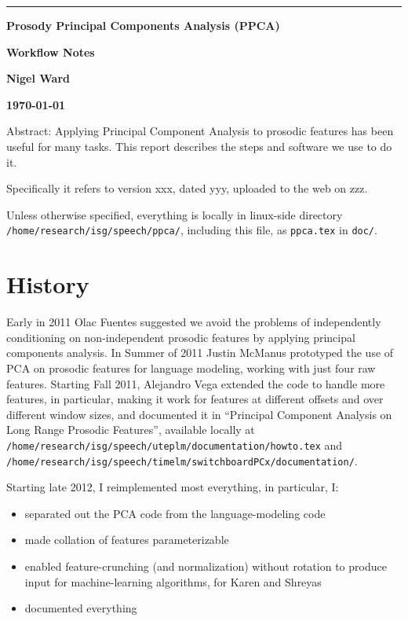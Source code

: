 \documentclass[11pt]{article}
\begin{document}
\noindent
\thispagestyle{empty}
\sloppy

\rule{1mm}{0mm}

\vspace{-17mm}
{\LARGE \bf Prosody Principal Components Analysis (PPCA) }
\medskip


{\LARGE \bf Workflow Notes}
\vspace{7mm}


{\bf Nigel Ward}

{\bf \today }

Abstract: Applying Principal Component Analysis to prosodic features
has been useful for many tasks.  This report describes the steps and
software we use to do it.  

\bigskip
Specifically it refers to version xxx, dated yyy, uploaded to the web on zzz.

Unless otherwise specified, everything is locally in linux-side
directory {\tt /home/research/isg/speech/ppca/}, including this file,
as {\tt ppca.tex} in {\tt doc/}.

\section{History}

Early in 2011 Olac Fuentes suggested we avoid the problems of
independently conditioning on non-independent prosodic features by
applying principal components analysis.  In Summer of 2011 Justin
McManus prototyped the use of PCA on prosodic features for language
modeling, working with just four raw features.  Starting Fall 2011,
Alejandro Vega extended the code to handle more features, in
particular, making it work for features at different offsets and over
different window sizes, and documented it in ``Principal Component
Analysis on Long Range Prosodic Features'', available locally at {\tt
  /home/research/isg/speech/uteplm/documentation/howto.tex} and {\tt
  /home/research/isg/speech/timelm/switchboardPCx/documentation/}.

Starting late 2012, I reimplemented most everything, in particular, I:
\begin{itemize}  \setlength{\itemsep}{0pt}\setlength{\parskip}{0pt}
\item separated out the PCA code from the language-modeling code
\item made collation of features parameterizable
\item enabled feature-crunching (and normalization) without rotation to
  produce input for machine-learning algorithms, for Karen and Shreyas
\item documented everything
\end{itemize}
\end{document}
